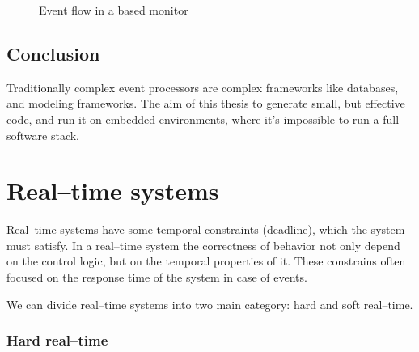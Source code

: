\begin{figure}[!h]
	\centering
	\caption{Event flow in a \cep based monitor}
	\label{fig:cep_monitoring_event_flow}
\end{figure}

\subsection{Conclusion}

Traditionally complex event processors are complex frameworks like databases, and modeling frameworks. The aim of this thesis to generate small, but effective code, and run it on embedded environments, where it's impossible to run a full \cep software stack.

\section{Real--time systems}

Real--time systems have some temporal constraints (deadline), which the system must satisfy. In a real--time system the correctness of behavior not only depend on the control logic, but on the temporal properties of it. These constrains often focused on the response time of the system in case of events.

We can divide real--time systems into two main category: hard and soft real--time.

\subsubsection{Hard real--time}

